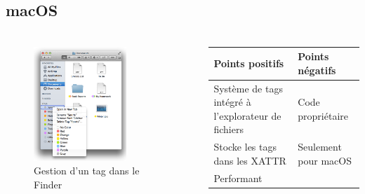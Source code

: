 \documentclass[10pt]{beamer}
\begin{document}
\subsection{macOS}
\begin{frame}
    \frametitle{\subsecname}
    \fontsize{8pt}{9}\selectfont
    \begin{columns}[T]
        \begin{column}{.55\textwidth}
            \begin{center}
                \begin{figure}
                    \includegraphics[width=0.7\textwidth]{images/macos_tags.png}
                    \caption{Gestion d'un tag dans le Finder \cite{ref5}}
                \end{figure}
            \end{center}
        \end{column}
        \pause
        \begin{column}{.45\textwidth}
            \begin{center}
                \begin{tabularx}{5.3cm}{|X|X|} \hline
                    \textbf{Points positifs} & \textbf{Points négatifs} \\ \hline
                    Système de tags intégré à l'explorateur de fichiers & Code propriétaire \\ \hline
                    Stocke les tags dans les XATTR & Seulement pour macOS \\ \hline
                    Performant & \\ \hline
                \end{tabularx}
            \end{center}
        \end{column}
    \end{columns}
\end{frame}
\end{document}
